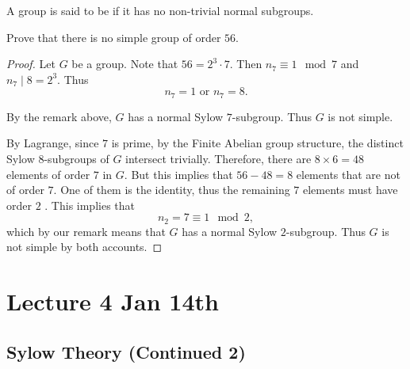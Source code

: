 \documentclass[notoc,notitlepage]{tufte-book}
\begin{document}
\begin{defn}\label{defn:simple_group}
  A group is said to be  if it has no non-trivial normal subgroups.
\end{defn}

\begin{eg}
  Prove that there is no simple group of order $56$.
\end{eg}

\begin{proof}
  Let $G$ be a group.
  Note that $56 = 2^3 \cdot 7$. Then $n_7 \equiv 1 \mod 7$ and
  $n_7 \mid 8 = 2^3$. Thus
  \begin{equation*}
    n_7 = 1 \text{ or } n_7 = 8.
  \end{equation*}

   By the remark above, $G$ has a normal Sylow
  $7$-subgroup. Thus $G$ is not simple.

   By Lagrange, since $7$ is prime, by the Finite
  Abelian group structure, the distinct Sylow $8$-subgroups of $G$
  intersect trivially. Therefore, there are $8 \times 6 = 48$ elements 
  of order $7$ in $G$. But this implies that $56 - 48 = 8$ elements that
  are not of order $7$.  One of them is the identity,
  thus the remaining $7$ elements must have order $2$ 
  . This implies that
  \begin{equation*}
    n_2 = 7 \equiv 1 \mod 2,
  \end{equation*}
  which by our remark means that $G$ has a normal Sylow $2$-subgroup.
  Thus $G$ is not simple by both accounts.
\end{proof}



\chapter{Lecture 4 Jan 14th}%
\label{chp:lecture_4_jan_14th}

\section{Sylow Theory (Continued 2)}%
\label{sec:sylow_theory_continued_2}
\end{document}
